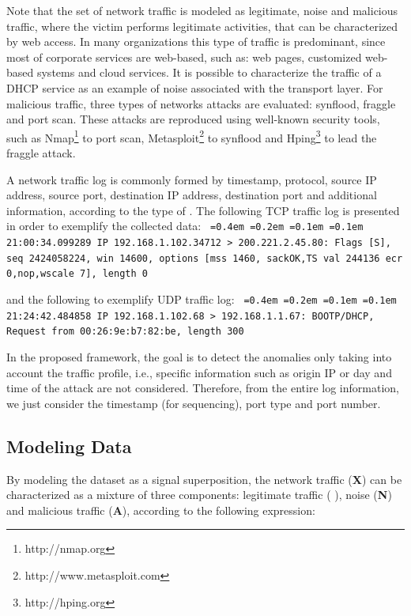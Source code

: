 \documentclass[review]{elsarticle}
\newcommand*\justify{%
	\fontdimen2\font=0.4em%
	\fontdimen3\font=0.2em%
	\fontdimen4\font=0.1em%
	\fontdimen7\font=0.1em%
}
\providecommand{\DIFaddtex}[1]{{\protect\color{blue}\uwave{#1}}} %
\providecommand{\DIFaddbegin}{} %
\providecommand{\DIFaddend}{} %
\providecommand{\DIFadd}[1]{\texorpdfstring{\DIFaddtex{#1}}{#1}} %
\begin{document}
Note that the set of network traffic is modeled as legitimate, noise and malicious traffic, where the victim performs legitimate activities, that can be characterized by web access. In many organizations this type of traffic is predominant, since most of corporate services are web-based, such as: web pages, customized web-based systems and cloud services. It is possible to characterize the traffic of a DHCP service as an example of noise associated with the transport layer. For malicious traffic, three types of networks attacks are evaluated: synflood, fraggle and port scan. These attacks are reproduced using well-known security tools, such as Nmap\footnote{http://nmap.org} to port scan, Metasploit\footnote{http://www.metasploit.com} to synflood and Hping\footnote{http://hping.org} to lead the fraggle attack.

A network traffic log is commonly formed by timestamp, protocol, source IP address, source port, destination IP address, destination port and additional information, according to the type of \DIFaddbegin \DIFadd{the used transport protocol}\DIFaddend . The following TCP traffic log is presented in order to exemplify the collected data:
\newline
\newline
\texttt{\justify21:00:34.099289 IP 192.168.1.102.34712 > 200.221.2.45.80: Flags [S], seq 2424058224, win 14600, options [mss 1460, sackOK,TS val 244136 ecr 0,nop,wscale 7], length 0}
\newline

and the following to exemplify UDP traffic log: 
\newline
\newline
\texttt{\justify21:24:42.484858 IP 192.168.1.102.68 > 192.168.1.1.67: BOOTP/DHCP, Request from 00:26:9e:b7:82:be, length 300}
\newline 

In the proposed framework, the goal is to detect the anomalies only taking into account the traffic profile, i.e., specific information such as origin IP or day and time of the attack are not considered. Therefore, from the entire log information, we just consider the timestamp (for sequencing), port type and port number.

\subsection{Modeling Data}
\label{sec:ModelingData}

By modeling the dataset as a signal superposition, the network traffic (\textbf{X}) can be characterized as a mixture of three components: legitimate traffic (\textbf{ \DIFaddbegin \DIFadd{U}\DIFaddend }), noise (\textbf{N}) and malicious traffic (\textbf{A}), according to the following expression:
\end{document}
